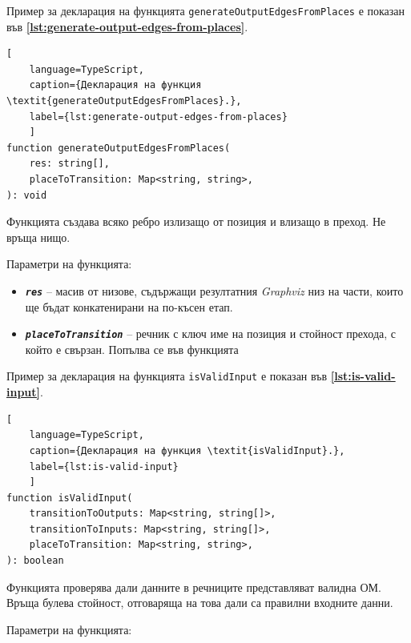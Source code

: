 \vspace{0.55cm}

Пример за декларация на функцията \texttt{generateOutputEdgesFromPlaces} е показан във \textbf{\autoref{lst:generate-output-edges-from-places}}.
\begin{lstlisting}[
	language=TypeScript,
	caption={Декларация на функция \textit{generateOutputEdgesFromPlaces}.},
	label={lst:generate-output-edges-from-places}
	]
function generateOutputEdgesFromPlaces(
    res: string[],
    placeToTransition: Map<string, string>,
): void
\end{lstlisting}

\vspace{-0.2cm}

Функцията създава всяко ребро излизащо от позиция и влизащо в преход. Не връща нищо.

Параметри на функцията:

\vspace{-0.3cm}

\begin{itemize}
	\item \texttt{\textbf{\textit{res}}} -- масив от низове, съдържащи резултатния \textit{Graphviz} низ на части, които ще бъдат конкатенирани на по-късен етап.
	\item \texttt{\textbf{\textit{placeToTransition}}} -- речник с ключ име на позиция и стойност прехода, с който е свързан. Попълва се във функцията
\end{itemize}

\vspace{0.55cm}

Пример за декларация на функцията \texttt{isValidInput} е показан във \textbf{\autoref{lst:is-valid-input}}.
\begin{lstlisting}[
	language=TypeScript,
	caption={Декларация на функция \textit{isValidInput}.},
	label={lst:is-valid-input}
	]
function isValidInput(
    transitionToOutputs: Map<string, string[]>,
    transitionToInputs: Map<string, string[]>,
    placeToTransition: Map<string, string>,
): boolean
\end{lstlisting}

Функцията проверява дали данните в речниците представляват валидна ОМ. Връща булева стойност, отговаряща на това дали са правилни входните данни.

Параметри на функцията:

\vspace{-0.3cm}

